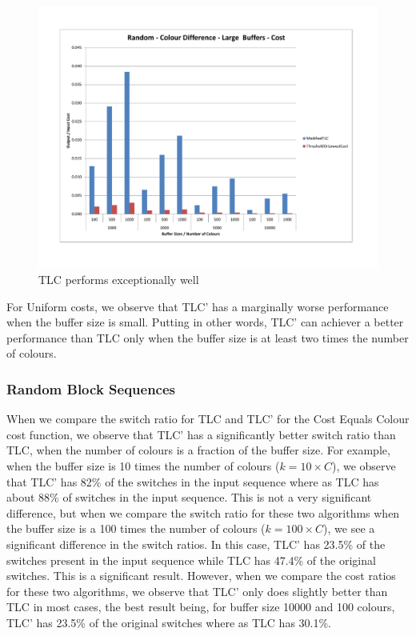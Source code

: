 \begin{figure}[ht]
\centering 
\includegraphics[scale=0.60]{Random-cd-large-cost.pdf}
\caption{TLC performs exceptionally well}
\label{randomCDLargeCost}
\end{figure}   

For Uniform costs, we observe that TLC' has a marginally worse performance when the buffer size is small. Putting in other words, TLC' can achiever a better performance than TLC only when the buffer size is at least two times the number of colours. 

\subsubsection{Random Block Sequences}

When we compare the switch ratio for TLC and TLC' for the Cost Equals Colour cost function, we observe that TLC' has a significantly better switch ratio than TLC, when the number of colours is a fraction of the buffer size. For example, when the buffer size is 10 times the number of colours ($ k = 10 \times C$), we observe that TLC' has 82\% of the switches in the input sequence where as TLC has about 88\% of switches in the input sequence. This is not a very significant difference, but when we compare the switch ratio for these two algorithms when the buffer size is a 100 times the number of colours ($ k = 100 \times C$), we see a significant difference in the switch ratios. In this case, TLC' has 23.5\% of the switches present in the input sequence while TLC has 47.4\% of the original switches. This is a significant result. However, when we compare the cost ratios for these two algorithms, we observe that TLC' only does slightly better than TLC in most cases, the best result being, for buffer size 10000 and 100 colours, TLC' has 23.5\% of the original switches where as TLC has 30.1\%. 

